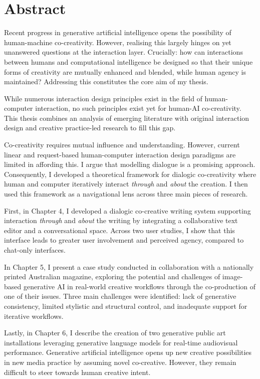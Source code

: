 \chapter{Abstract}

Recent progress in generative artificial intelligence opens the possibility of human-machine co-creativity. However, realising this largely hinges on yet unanswered questions at the interaction layer. Crucially: how can interactions between humans and computational intelligence be designed so that their unique forms of creativity are mutually enhanced and blended, while human agency is maintained? Addressing this constitutes the core aim of my thesis.

While numerous interaction design principles exist in the field of human-computer interaction, no such principles exist yet for human-AI co-creativity. This thesis combines an analysis of emerging literature with original interaction design and creative practice-led research to fill this gap. 

Co-creativity requires mutual influence and understanding. However, current linear and request-based human-computer interaction design paradigms are limited in affording this. I argue that modelling dialogue is a promising approach. Consequently, I developed a theoretical framework for dialogic co-creativity where human and computer iteratively interact \textit{through} and \textit{about} the creation.  I then used this framework as a navigational lens across three main pieces of research. 

First, in Chapter 4, I developed a dialogic co-creative writing system supporting interaction \textit{through} and \textit{about} the writing by integrating a collaborative text editor and a conversational space. Across two user studies, I show that this interface leads to greater user involvement and perceived agency, compared to chat-only interfaces.  

In Chapter 5, I present a case study conducted in collaboration with a nationally printed Australian magazine, exploring the potential and challenges of image-based generative AI in real-world creative workflows through the co-production of one of their issues. Three main challenges were identified: lack of generative consistency, limited stylistic and structural control, and inadequate support for iterative workflows. 

Lastly, in Chapter 6, I describe the creation of two generative public art installations leveraging generative language models for real-time audiovisual performance. Generative artificial intelligence opens up new creative possibilities in new media practice by assuming novel co-creative. However, they remain difficult to steer towards human creative intent. 

